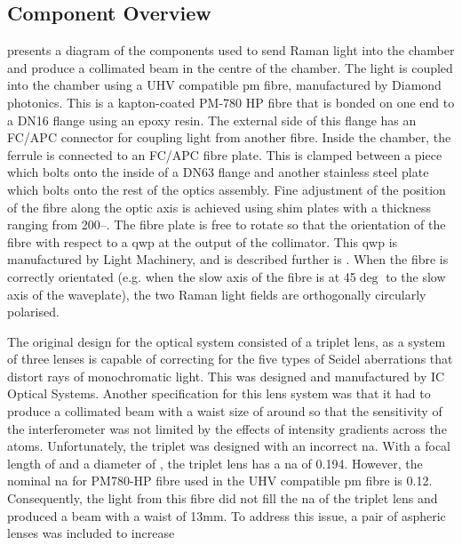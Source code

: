 \subsection{Component Overview}\label{subsec:setup_ramancollimator}
 presents a diagram of the components used to
send Raman light into the chamber and produce a collimated beam in the centre of
the chamber. The light is coupled into the chamber using a UHV compatible
\ac{pm} fibre, manufactured by Diamond photonics. This is a kapton-coated PM-780
HP fibre that is bonded on one end to a DN16 flange using an epoxy resin. The
external side of this flange has an FC/APC connector for coupling light from
another fibre. Inside the chamber, the ferrule is connected to an FC/APC fibre
plate. This is clamped between a piece which bolts onto the inside of a DN63
flange and another stainless steel plate which bolts onto the rest of the optics
assembly. Fine adjustment of the position of the fibre along the optic axis is
achieved using shim plates with a thickness ranging from
200--. The fibre plate is free to rotate so that the
orientation of the fibre with respect to a \ac{qwp} at the output of the
collimator. This \ac{qwp} is manufactured by Light Machinery, and is described
further is . When the fibre is correctly
orientated (e.g. when the slow axis of the fibre is at 45\(\deg\) to the slow
axis of the waveplate), the two Raman light fields are orthogonally circularly
polarised. \par\noindent The original design for the optical system consisted of
a triplet lens, as a system of three lenses is capable of correcting for the
five types of Seidel aberrations that distort rays of monochromatic light. This
was designed and manufactured by IC Optical Systems. Another specification for
this lens system was that it had to produce a collimated beam with a waist size
of around  so that the sensitivity of the
interferometer was not limited by the effects of intensity gradients across the
atoms. Unfortunately, the triplet was designed with an incorrect \ac{na}. With a
focal length of  and a diameter of
, the triplet lens has a \ac{na} of 0.194. However,
the nominal \ac{na} for PM780-HP fibre used in the UHV compatible \ac{pm} fibre
is 0.12. Consequently, the light from this fibre did not fill the \ac{na} of the
triplet lens and produced a beam with a waist of 13mm. 
To address this issue, a pair of aspheric lenses was included to increase
